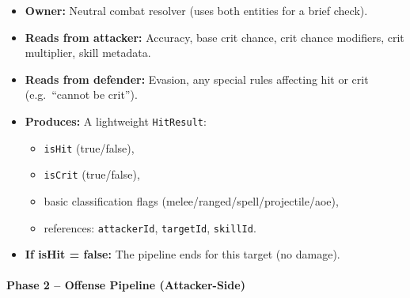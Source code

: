 \begin{itemize}
	\item \textbf{Owner:} Neutral combat resolver (uses both entities for a brief check).
	\item \textbf{Reads from attacker:}
	Accuracy, base crit chance, crit chance modifiers, crit multiplier, skill metadata.
	\item \textbf{Reads from defender:}
	Evasion, any special rules affecting hit or crit (e.g.\ ``cannot be crit'').
	\item \textbf{Produces:} A lightweight \texttt{HitResult}:
	\begin{itemize}
		\item \texttt{isHit} (true/false),
		\item \texttt{isCrit} (true/false),
		\item basic classification flags (melee/ranged/spell/projectile/aoe),
		\item references: \texttt{attackerId}, \texttt{targetId}, \texttt{skillId}.
	\end{itemize}
	\item \textbf{If isHit = false:} The pipeline ends for this target (no damage).
\end{itemize}

\paragraph{Phase 2 -- Offense Pipeline (Attacker-Side)}


